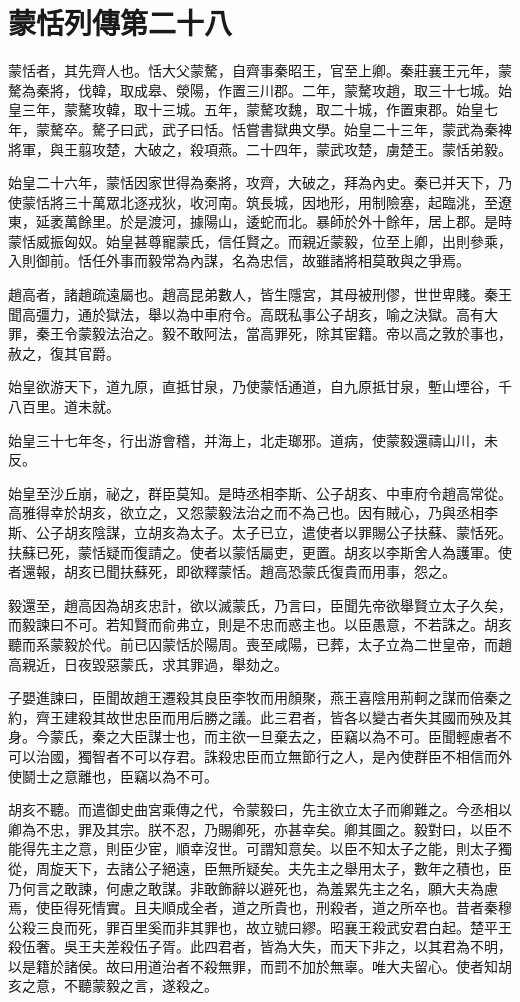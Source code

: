 \chapter{蒙恬列傳第二十八}

蒙恬者，其先齊人也。恬大父蒙驁，自齊事秦昭王，官至上卿。秦莊襄王元年，蒙驁為秦將，伐韓，取成皋、滎陽，作置三川郡。二年，蒙驁攻趙，取三十七城。始皇三年，蒙驁攻韓，取十三城。五年，蒙驁攻魏，取二十城，作置東郡。始皇七年，蒙驁卒。驁子曰武，武子曰恬。恬嘗書獄典文學。始皇二十三年，蒙武為秦裨將軍，與王翦攻楚，大破之，殺項燕。二十四年，蒙武攻楚，虜楚王。蒙恬弟毅。

始皇二十六年，蒙恬因家世得為秦將，攻齊，大破之，拜為內史。秦已并天下，乃使蒙恬將三十萬眾北逐戎狄，收河南。筑長城，因地形，用制險塞，起臨洮，至遼東，延袤萬餘里。於是渡河，據陽山，逶蛇而北。暴師於外十餘年，居上郡。是時蒙恬威振匈奴。始皇甚尊寵蒙氏，信任賢之。而親近蒙毅，位至上卿，出則參乘，入則御前。恬任外事而毅常為內謀，名為忠信，故雖諸將相莫敢與之爭焉。

趙高者，諸趙疏遠屬也。趙高昆弟數人，皆生隱宮，其母被刑僇，世世卑賤。秦王聞高彊力，通於獄法，舉以為中車府令。高既私事公子胡亥，喻之決獄。高有大罪，秦王令蒙毅法治之。毅不敢阿法，當高罪死，除其宦籍。帝以高之敦於事也，赦之，復其官爵。

始皇欲游天下，道九原，直抵甘泉，乃使蒙恬通道，自九原抵甘泉，塹山堙谷，千八百里。道未就。

始皇三十七年冬，行出游會稽，并海上，北走瑯邪。道病，使蒙毅還禱山川，未反。

始皇至沙丘崩，祕之，群臣莫知。是時丞相李斯、公子胡亥、中車府令趙高常從。高雅得幸於胡亥，欲立之，又怨蒙毅法治之而不為己也。因有賊心，乃與丞相李斯、公子胡亥陰謀，立胡亥為太子。太子已立，遣使者以罪賜公子扶蘇、蒙恬死。扶蘇已死，蒙恬疑而復請之。使者以蒙恬屬吏，更置。胡亥以李斯舍人為護軍。使者還報，胡亥已聞扶蘇死，即欲釋蒙恬。趙高恐蒙氏復貴而用事，怨之。

毅還至，趙高因為胡亥忠計，欲以滅蒙氏，乃言曰，臣聞先帝欲舉賢立太子久矣，而毅諫曰不可。若知賢而俞弗立，則是不忠而惑主也。以臣愚意，不若誅之。胡亥聽而系蒙毅於代。前已囚蒙恬於陽周。喪至咸陽，已葬，太子立為二世皇帝，而趙高親近，日夜毀惡蒙氏，求其罪過，舉劾之。

子嬰進諫曰，臣聞故趙王遷殺其良臣李牧而用顏聚，燕王喜陰用荊軻之謀而倍秦之約，齊王建殺其故世忠臣而用后勝之議。此三君者，皆各以變古者失其國而殃及其身。今蒙氏，秦之大臣謀士也，而主欲一旦棄去之，臣竊以為不可。臣聞輕慮者不可以治國，獨智者不可以存君。誅殺忠臣而立無節行之人，是內使群臣不相信而外使鬬士之意離也，臣竊以為不可。

胡亥不聽。而遣御史曲宮乘傳之代，令蒙毅曰，先主欲立太子而卿難之。今丞相以卿為不忠，罪及其宗。朕不忍，乃賜卿死，亦甚幸矣。卿其圖之。毅對曰，以臣不能得先主之意，則臣少宦，順幸沒世。可謂知意矣。以臣不知太子之能，則太子獨從，周旋天下，去諸公子絕遠，臣無所疑矣。夫先主之舉用太子，數年之積也，臣乃何言之敢諫，何慮之敢謀。非敢飾辭以避死也，為羞累先主之名，願大夫為慮焉，使臣得死情實。且夫順成全者，道之所貴也，刑殺者，道之所卒也。昔者秦穆公殺三良而死，罪百里奚而非其罪也，故立號曰繆。昭襄王殺武安君白起。楚平王殺伍奢。吳王夫差殺伍子胥。此四君者，皆為大失，而天下非之，以其君為不明，以是籍於諸侯。故曰用道治者不殺無罪，而罰不加於無辜。唯大夫留心。使者知胡亥之意，不聽蒙毅之言，遂殺之。

